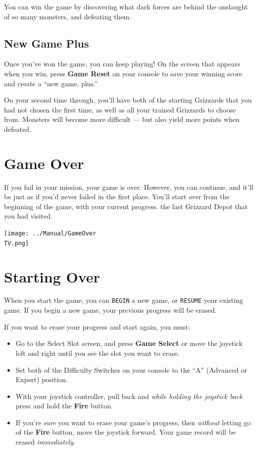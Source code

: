 \documentclass[10pt,twocolumn,openany,article]{memoir}
\newcommand\TV{NTSC}
\newcommand\TV{PAL}
\newcommand\TV{SECAM}
\begin{document}
You can  win the  game by  discovering what dark  forces are  behind the
onslaught of so many monsters, and defeating them.

\subsection*{New Game Plus}\label{sec:NewGamePlus}

Once  you've won  the game,  you can  keep playing!  On the  screen that
appears when you win, press \textbf{Game  Reset} on your console to save
your winning score and create a ``new game, plus.''

On your second time through, you'll  have both of the starting Grizzards
that you  had not  chosen the first  time, as well  as all  your trained
Grizzards to choose from. Monsters will become more difficult — but also
yield more points when defeated.

\section{Game Over}

If  you fail  in  your mission,  your  game is  over.  However, you  can
continue, and it'll be just as if you'd never failed in the first place.
You'll start over from \ifdefined\NOSAVE the beginning of the game, with
your  current progress.  \else  the  last Grizzard  Depot  that you  had
visited. \fi

\begin{center}
  \texttt{[image: ../Manual/GameOver\\TV.png]}
\end{center}

\section{Starting Over}\label{Starting Your Adventure Over}

\ifdefined\NOSAVE

When  you  start  the  game,  you can  \texttt{BEGIN}  a  new  game,  or
\texttt{RESUME}  your existing  game.  If  you begin  a  new game,  your
previous progress will be erased.

\else

If you want to erase your progress and start again, you must:

\begin{itemize}
\item Go  to the Select Slot  screen, and press \textbf{Game  Select} or
  move  the joystick  left and  right until  you see  the slot  you want
  to erase.
\item Set both  of the Difficulty Switches on your  console to the ``A''
  (Advanced or Expert) position.
\item With your  joystick controller, pull back  and \emph{while holding
    the joystick back} press and hold the \textbf{Fire} button.
\item If you're \emph{sure} you want to erase your game's progress, then
  \emph{without}  letting  go  of  the \textbf{Fire}  button,  move  the
  joystick  forward. \ifdefined\DEMO  Your  game record  will be  erased
  \emph{immediately}. \fi
\end{itemize}
\end{document}
